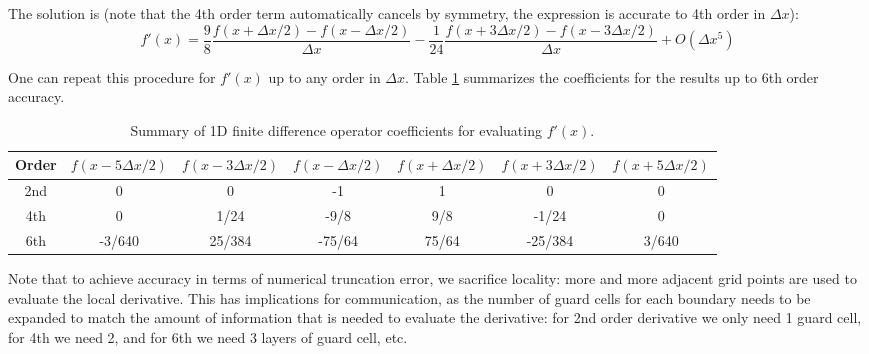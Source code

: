 The solution is (note that the 4th order term automatically cancels by symmetry,
the expression is accurate to 4th order in $\Delta x$):
\begin{equation}
  \label{eq:4th-order-sol}
  f'(x) = \frac{9}{8}\frac{f(x + \Delta x/2) - f(x - \Delta x / 2)}{\Delta x} - \frac{1}{24}\frac{f(x + 3\Delta x / 2) - f(x - 3\Delta x / 2)}{\Delta x} + O(\Delta x^5)
\end{equation}

One can repeat this procedure for $f'(x)$ up to any order in $\Delta x$. Table
\ref{tab:finite-diff} summarizes the coefficients for the results up to 6th
order accuracy.

\begin{table}[h]
  \centering
  \begin{tabular}{ccccccc}
    Order & $f(x - 5\Delta x/2)$ & $f(x - 3\Delta x / 2)$ & $f(x - \Delta x/2)$ & $f(x + \Delta x/2)$ & $f(x + 3\Delta x/2)$ & $f(x + 5\Delta x/2)$  \\ \hline
    2nd & 0 & 0 & -1 & 1 & 0 & 0 \\ \hline
    4th & 0 & 1/24 & -9/8 & 9/8 & -1/24 & 0 \\ \hline
    6th & -3/640 & 25/384 & -75/64 & 75/64 & -25/384 & 3/640 \\ \hline
  \end{tabular}
  \caption{Summary of 1D finite difference operator coefficients for evaluating $f'(x)$.}
  \label{tab:finite-diff}
\end{table}

Note that to achieve accuracy in terms of numerical truncation error, we
sacrifice locality: more and more adjacent grid points are used to evaluate the
local derivative. This has implications for communication, as the number of
guard cells for each boundary needs to be expanded to match the amount of
information that is needed to evaluate the derivative: for 2nd order derivative
we only need 1 guard cell, for 4th we need 2, and for 6th we need 3 layers of
guard cell, etc.

